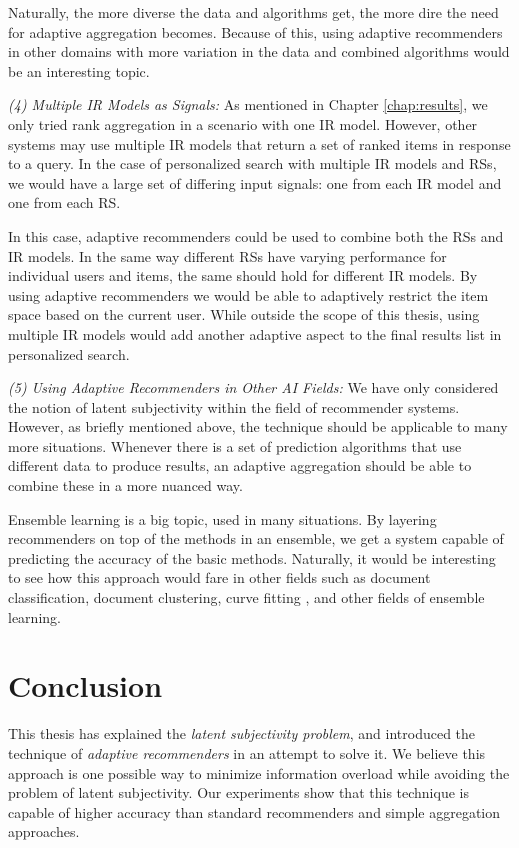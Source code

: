 Naturally, the more diverse the data and algorithms get,
the more dire the need for adaptive aggregation becomes.
Because of this, using adaptive recommenders in other domains with more variation 
in the data and combined algorithms would be an interesting topic.


\emph{(4) Multiple IR Models as Signals:}
As mentioned in Chapter \ref{chap:results},
we only tried rank aggregation in a scenario with one IR model.
However, other systems may use multiple IR models
that return a set of ranked items in response to a query.
In the case of personalized search with multiple IR models
and RSs, we would have a large set of differing
input signals:
one from each IR model and one from each RS.

In this case, adaptive recommenders could be used to combine
both the RSs and IR models.
In the same way different RSs have varying performance
for individual users and items, the same should hold
for different IR models.
By using adaptive recommenders we would be able
to adaptively restrict the item space based on the 
current user.
While outside the scope of this thesis,
using multiple IR models would add another adaptive
aspect to the final results list in personalized search.


\emph{(5) Using Adaptive Recommenders in Other AI Fields:}
We have only considered the notion of latent subjectivity within the field of recommender systems.
However, as briefly mentioned above, the technique should be applicable to many more situations.
Whenever there is a set of prediction algorithms that use different data to produce results,
an adaptive aggregation should be able to combine these in a more nuanced way.

Ensemble learning is a big topic, used in many situations.
By layering recommenders on top of the methods in an ensemble, 
we get a system capable of predicting the accuracy of the basic methods.
Naturally, it would be interesting to see how this approach would fare
in other fields such as document classification, document clustering,
curve fitting \cite[p7]{Polikar2006}, and other fields of ensemble learning.


\section{Conclusion}

This thesis has explained the \emph{latent subjectivity problem},
and introduced the technique of \emph{adaptive recommenders}
in an attempt to solve it.
We believe this approach is one possible way to minimize information overload
while avoiding the problem of latent subjectivity.
Our experiments show that this technique is capable of higher accuracy
than standard recommenders and simple aggregation approaches.

